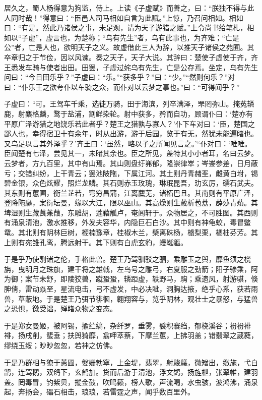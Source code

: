 \documentclass[12pt,UTF8]{ctexbook}
\begin{document}
居久之，蜀人杨得意为狗监，侍上。上读《子虚赋》而善之，曰：“朕独不得与此人同时哉！”得意曰：“臣邑人司马相如自言为此赋。”上惊，乃召问相如。相如曰：“有是。然此乃诸侯之事，未足观，请为天子游猎之赋。”上令尚书给笔札，相如以“子虚”，虚言也，为楚称；“乌有先生”者，乌有此事也，为齐难；“亡是公”者，亡是人也，欲明天子之义。故虚借此三人为辞，以推天子诸侯之苑囿。其卒章归之于节俭，因以风谏。奏之天子，天子大说。其辞曰：楚使子虚使于齐，齐王悉发车骑与使者出田。田罢，子虚过姹乌有先生，亡是公存焉。坐定，乌有先生问曰：“今日田乐乎？”子虚曰：“乐。”“获多乎？”曰：“少。”“然则何乐？”对曰：“仆乐王之欲夸仆以车骑之众，而仆对以云梦之事也。”曰：“可得闻乎？”



子虚曰：“可。王驾车千乘，选徒万骑，田于海滨，列卒满泽，罘罔弥山。掩菟辚鹿，射麋格麟，鹜于盐浦，割鲜染轮。射中获多，矜而自功，顾谓仆曰：‘楚亦有平原广泽游猎之地饶乐若此者乎？楚王之猎孰与寡人？’仆下车对曰：‘臣，楚国之鄙人也，幸得宿卫十有余年，时从出游，游于后园，览于有无，然犹未能遍睹也。又乌足以言其外泽乎？’齐王曰：‘虽然，略以子之所闻见言之。’“仆对曰：‘唯唯。臣闻楚有七泽，尝见其一，未睹其余也。臣之所见，盖特其小小者耳，名曰云梦。云梦者，方九百里，其中有山焉。其山则盘纡岪郁，隆崇律崒；岑崟参差，日月蔽亏；交错纠纷，上干青云；罢池陂陁，下属江河。其土则丹青赭垩，雌黄白坿，锡碧金银，众色炫耀，照烂龙鳞。其石则赤玉玫瑰，琳珉昆吾，玏玄厉，礝石武夫。其东则有蕙圃，衡兰芷若，穹穷昌蒲，江离蘪芜，诸柘巴且。其南则有平原广泽，登降陁靡，案衍坛曼，缘以大江，限以巫山。其高燥则生葴析苞荔，薜莎青薠。其埤湿则生藏莨蒹葭，东雕胡，莲藉觚卢，奄闾轩于。众物居之，不可胜图。其西则有涌泉清池，激水推移，外发夫容华，内隐巨石白沙。其中则有神龟蛟，毒冒鳖鼋。其北则有阴林巨树，楩楠豫章，桂椒木兰，檗离硃杨，樝梨栗，橘柚芬芳。其上则有宛雏孔鸾，腾远射干。其下则有白虎玄豹，蟃蜒貙。



于是乎乃使剸诸之伦，手格此兽。楚王乃驾驯驳之驷，乘雕玉之舆，靡鱼须之桡旃，曳明月之珠旗，建干将之雄戟，左鸟号之雕弓，右夏服之劲箭；阳子骖乘，阿为御；案节未舒，即陵狡兽，蹴蛩蛩，辚距虚，轶野马，騊；乘遗风，射游骐，倏胂倩，雷动焱至，星流电击，弓不虚发，中必决眦，洞胸达掖，绝乎心系，获若雨兽，草蔽地。于是楚王乃弭节徘徊，翱翔容与，览乎阴林，观壮士之暴怒，与猛兽之恐惧，徼受诎，殚睹众物之变态。



于是郑女曼姬，被阿锡，揄纻缟，杂纤罗，垂雾，襞积褰绉，郁桡溪谷；衯衯裶裶，扬戌削，蜚垂；扶舆猗靡，翕呷萃蔡，下摩兰蕙，上拂羽盖；错翡翠之葳蕤，缪绕玉绥；眇眇忽忽，若神之仿佛。



于是乃群相与獠于蕙圃，媻姗勃窣，上金堤，翡翠，射鵔鸃，微矰出，缴施，弋白鹄，连驾鹅，双鸧下，玄鹤加。贷而后游于清池，浮文鹢，扬旌枻，张翠帷，建羽盖。罔毒冒，钓紫贝，摐金鼓，吹鸣籁，榜人歌，声流喝，水虫骇，波鸿沸，涌泉起，奔扬会，礧石相击，琅琅，若雷霆之声，闻乎数百里外。
\end{document}
